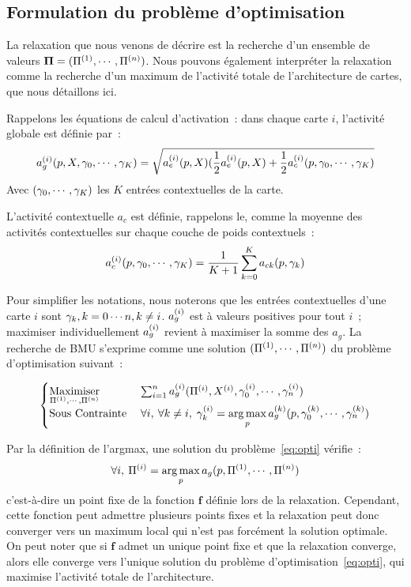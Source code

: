 \documentclass[../main]{subfiles}
\begin{document}
\subsection{Formulation du problème d'optimisation}\label{sec:formulation_argmax}

La relaxation que nous venons de décrire est la recherche d'un ensemble de valeurs $\mathbf{\Pi} = (\Pi^{({1})}, \cdots, \Pi^{({n})})$.
Nous pouvons également interpréter la relaxation comme la recherche d'un maximum de l'activité totale de l'architecture de cartes, que nous détaillons ici. 

Rappelons les équations de calcul d'activation~:
dans chaque carte $i$, l'activité globale est définie par~:
\begin{equation}\label{eq:ag}
	a_g^{({i})}(p, X, \gamma_0, \cdots, \gamma_K) = \sqrt{a_e^{({i})}(p,X)(\frac{1}{2}a_e^{({i})}(p,X) + \frac{1}{2}a_c^{({i})}(p,\gamma_0, \cdots, \gamma_K)}
\end{equation}
Avec $(\gamma_0, \cdots, \gamma_K)$ les $K$ entrées contextuelles de la carte. 

L'activité contextuelle $a_c$ est définie, rappelons le, comme la moyenne des activités contextuelles sur chaque couche de poids contextuels~:
\begin{equation}
	a_c^{({i})}(p, \gamma_0, \cdots, \gamma_K) = \frac{1}{K+1}\sum_{k=0}^{K}{a_{ck}(p, \gamma_k)}
\end{equation}

Pour simplifier les notations, nous noterons que les entrées contextuelles d'une carte $i$ sont ${\gamma_k, k = 0 \cdots n , k \neq i}$.
$a_g^{({i})}$ est à valeurs positives pour tout $i$~; maximiser individuellement $a_g^{({i})}$ revient à maximiser la somme des $a_g$. 
La recherche de BMU s'exprime comme une solution $(\Pi^{({1})}, \cdots, \Pi^{({n})})$ du problème d'optimisation suivant~:

\begin{equation}\label{eq:opti}
	\begin{cases}
	\operatorname*{Maximiser}\limits_{\Pi^{({1})}, \cdots, \Pi^{({n})}}\;& \sum_{i = 1}^n a_g^{({i})}(\Pi^{({i})},X^{({i})},\gamma_0^{({i})}, \cdots, \gamma_n^{({i})}) \\
	\text{Sous Contrainte}\; &\forall i,\:\forall k \neq i, \; \gamma_k^{({i})} = \operatorname*{arg\,max}\limits_p a_g^{({k})}(p,\gamma_0^{({k})}, \cdots, \gamma_n^{({k})})
	\end{cases}
\end{equation}

Par la définition de l'argmax, une solution du problème~\ref{eq:opti} vérifie~:
$$\forall i, \: \Pi^{({i})} = \operatorname*{arg\,max}_p a_g(p, \Pi^{({1})}, \cdots, \Pi^{({n})})$$
c'est-à-dire un point fixe de la fonction $\mathbf{f}$ définie lors de la relaxation.
Cependant, cette fonction peut admettre plusieurs points fixes et la relaxation peut donc converger vers un maximum local qui n'est pas forcément la solution optimale.
On peut noter que si $\mathbf{f}$ admet un unique point fixe et que la relaxation converge, alors elle converge vers l'unique solution du problème d'optimisation~\ref{eq:opti}, qui maximise l'activité totale de l'architecture.
\end{document}
